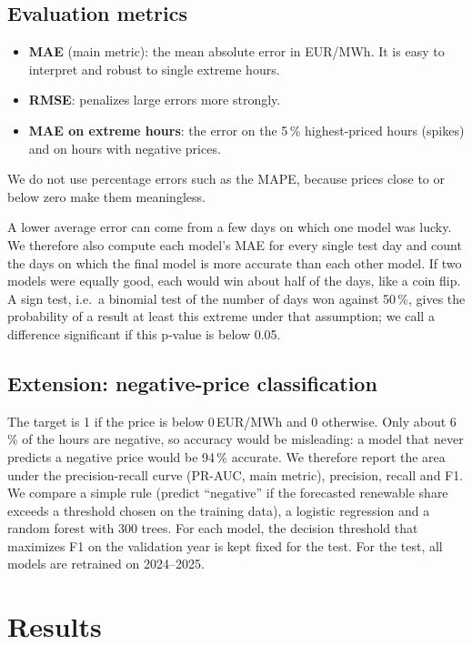 \documentclass[12pt,oneside]{article}
\begin{document}
\subsection{Evaluation metrics}

\begin{itemize}
    \item \textbf{MAE} (main metric): the mean absolute error in EUR/MWh. It is easy to interpret and robust to single extreme hours.
    \item \textbf{RMSE}: penalizes large errors more strongly.
    \item \textbf{MAE on extreme hours}: the error on the 5\,\% highest-priced hours (spikes) and on hours with negative prices.
\end{itemize}

We do not use percentage errors such as the MAPE, because prices close to or below zero make them meaningless.

A lower average error can come from a few days on which one model was lucky. We therefore also compute each model's MAE for every single test day and count the days on which the final model is more accurate than each other model. If two models were equally good, each would win about half of the days, like a coin flip. A sign test, i.e.\ a binomial test of the number of days won against 50\,\%, gives the probability of a result at least this extreme under that assumption; we call a difference significant if this p-value is below 0.05.

\subsection{Extension: negative-price classification} \label{sec:classmethod}

The target is 1 if the price is below 0\,EUR/MWh and 0 otherwise. Only about 6\,\% of the hours are negative, so accuracy would be misleading: a model that never predicts a negative price would be 94\,\% accurate. We therefore report the area under the precision-recall curve (PR-AUC, main metric), precision, recall and F1. We compare a simple rule (predict \enquote{negative} if the forecasted renewable share exceeds a threshold chosen on the training data), a logistic regression and a random forest with 300 trees. For each model, the decision threshold that maximizes F1 on the validation year is kept fixed for the test. For the test, all models are retrained on 2024--2025.

\section{Results} \label{sec:results}
\end{document}
